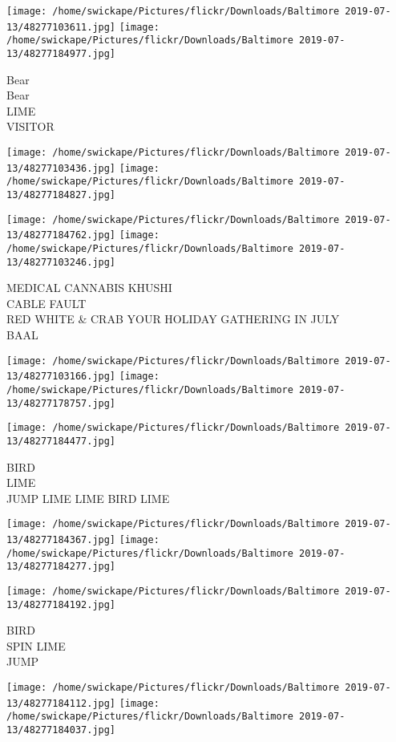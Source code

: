 \documentclass[10pt,letterpaper]{article}
\begin{document}
\texttt{[image: /home/swickape/Pictures/flickr/Downloads/Baltimore 2019-07-13/48277103611.jpg]}
\texttt{[image: /home/swickape/Pictures/flickr/Downloads/Baltimore 2019-07-13/48277184977.jpg]}

Bear\\
Bear\\
LIME\\
VISITOR
\pagebreak

\texttt{[image: /home/swickape/Pictures/flickr/Downloads/Baltimore 2019-07-13/48277103436.jpg]}
\texttt{[image: /home/swickape/Pictures/flickr/Downloads/Baltimore 2019-07-13/48277184827.jpg]}

\texttt{[image: /home/swickape/Pictures/flickr/Downloads/Baltimore 2019-07-13/48277184762.jpg]}
\texttt{[image: /home/swickape/Pictures/flickr/Downloads/Baltimore 2019-07-13/48277103246.jpg]}

MEDICAL CANNABIS KHUSHI\\
CABLE FAULT\\
RED WHITE \& CRAB YOUR HOLIDAY GATHERING IN JULY\\
BAAL
\pagebreak

\texttt{[image: /home/swickape/Pictures/flickr/Downloads/Baltimore 2019-07-13/48277103166.jpg]}
\texttt{[image: /home/swickape/Pictures/flickr/Downloads/Baltimore 2019-07-13/48277178757.jpg]}

\vspace{0.25in}
\texttt{[image: /home/swickape/Pictures/flickr/Downloads/Baltimore 2019-07-13/48277184477.jpg]}

BIRD\\
LIME\\
JUMP LIME LIME BIRD LIME
\pagebreak

\texttt{[image: /home/swickape/Pictures/flickr/Downloads/Baltimore 2019-07-13/48277184367.jpg]}
\texttt{[image: /home/swickape/Pictures/flickr/Downloads/Baltimore 2019-07-13/48277184277.jpg]}

\vspace{0.25in}
\texttt{[image: /home/swickape/Pictures/flickr/Downloads/Baltimore 2019-07-13/48277184192.jpg]}

BIRD\\
SPIN LIME\\
JUMP
\pagebreak

\texttt{[image: /home/swickape/Pictures/flickr/Downloads/Baltimore 2019-07-13/48277184112.jpg]}
\texttt{[image: /home/swickape/Pictures/flickr/Downloads/Baltimore 2019-07-13/48277184037.jpg]}
\end{document}
